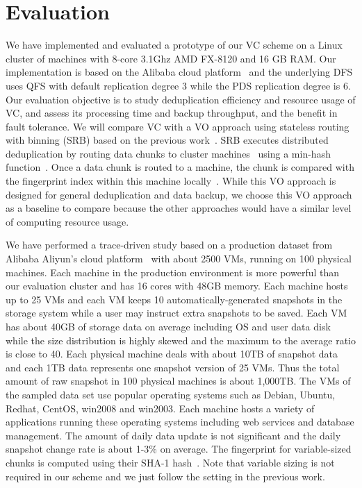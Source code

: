 \section{Evaluation}
\label{sect:evaluation}
We have implemented and evaluated a prototype of our VC scheme on a Linux cluster of machines with
8-core 3.1Ghz AMD FX-8120 and 16 GB RAM. 
Our implementation is based on the Alibaba cloud platform~\cite{Aliyun,WeiZhangIEEE}
and the underlying DFS uses  QFS with default replication degree 3 while the PDS replication degree is 6.
Our evaluation objective is to
study deduplication efficiency and resource usage of VC,  
and assess its processing time and backup throughput, and  
the benefit in fault tolerance. 
We will compare VC with a VO approach  using stateless routing with binning (SRB) 
based on the previous work~\cite{Dong2011,extreme_binning09}.
SRB executes distributed deduplication by routing data chunks to cluster machines~\cite{Dong2011}
using  a min-hash function~\cite{extreme_binning09}. Once a data chunk is routed to
a machine, the chunk is compared with the fingerprint index within this machine 
locally~\cite{extreme_binning09}.
While this VO approach is designed for general deduplication and data backup,
we choose this VO approach as a baseline to compare because the other
approaches would have  a similar level of computing resource usage.


We have performed a trace-driven study based on a production dataset
from Alibaba Aliyun's cloud platform~\cite{Aliyun} 
with about 2500 VMs, running on 100 physical machines. 
Each machine in the production environment is more powerful than our evaluation cluster
and has 16 cores with 48GB memory.
Each machine hosts up to 25 VMs and each VM keeps 10 automatically-generated snapshots in the storage 
system while a user may instruct extra snapshots to be saved.
Each VM has about 40GB of storage  data  on average
including OS and user data disk while the size distribution is highly skewed and the maximum to
the average ratio is close to 40.
Each physical machine deals with about 10TB of snapshot data and each 1TB data represents one snapshot version
of 25 VMs.  Thus the total amount of raw snapshot in 100 physical machines
is about 1,000TB.
The VMs of the sampled data set use popular operating systems such as 
Debian, Ubuntu, Redhat, CentOS, win2008 and win2003. 
Each machine hosts a variety of applications running these operating systems including web services and 
database management. The amount of daily data update is not significant and
the daily snapshot change rate is about 1-3\% on average.
The fingerprint for variable-sized chunks is computed using their SHA-1 hash~\cite{similar94,rabin81}. 
Note that variable sizing is not required in our scheme and we just follow the setting in the previous work.

